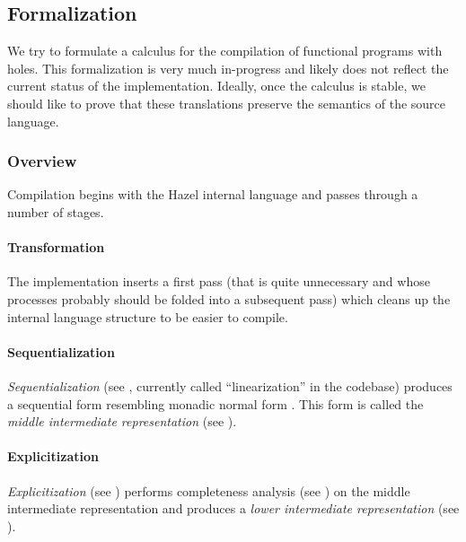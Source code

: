 \documentclass[index.tex]{subfiles}
\begin{document}
\subsection{Formalization}
\label{formalization}
We try to formulate a calculus for the compilation of functional programs with holes. This
formalization is very much in-progress and likely does not reflect the current status of the
implementation. Ideally, once the calculus is stable, we should like to prove that these
translations preserve the semantics of the source language.

\subsubsection{Overview}
Compilation begins with the Hazel internal language and passes through a number of stages.

\paragraph{Transformation}
The implementation inserts a first pass (that is quite unnecessary and whose processes probably
should be folded into a subsequent pass) which cleans up the internal language structure to be
easier to compile.

\paragraph{Sequentialization}
\emph{Sequentialization} (see , currently called ``linearization'' in
the codebase) produces a sequential form resembling monadic normal form \cite{danvy2003}. This form
is called the \emph{middle intermediate representation} (see ).

\paragraph{Explicitization}
\emph{Explicitization} (see ) performs completeness analysis (see ) on the
middle intermediate representation and produces a \emph{lower intermediate representation}
(see ).



\end{document}
